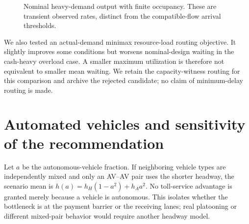 \documentclass[12pt,letterpaper]{article}
\begin{document}
\begin{figure}[htbp]\centering{}\caption{Nominal heavy-demand output with finite occupancy. These are transient observed rates, distinct from the compatible-flow arrival thresholds.}\label{fig:buffers}\end{figure}
We also tested an actual-demand minimax resource-load routing objective. It slightly improves some conditions but worsens nominal-design waiting in the cash-heavy overload case. A smaller maximum utilization is therefore not equivalent to smaller mean waiting. We retain the capacity-witness routing for this comparison and archive the rejected candidate; no claim of minimum-delay routing is made.

\section{Automated vehicles and sensitivity of the recommendation}
Let $a$ be the autonomous-vehicle fraction. If neighboring vehicle types are independently mixed and only an AV--AV pair uses the shorter headway, the scenario mean is $h(a)=h_H(1-a^2)+h_Aa^2$. No toll-service advantage is granted merely because a vehicle is autonomous. This isolates whether the bottleneck is at the payment barrier or the receiving lanes; real platooning or different mixed-pair behavior would require another headway model.
\end{document}
